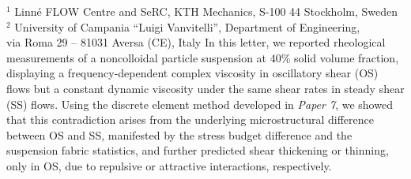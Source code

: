 %
%
%
%
%
%
%
\paperaffiliation
{%
  $^1$ Linn\'e FLOW Centre and SeRC, KTH Mechanics, S-100 44 Stockholm, Sweden\\%
  $^2$ University of Campania ``Luigi Vanvitelli'', Department of Engineering, \\via Roma 29 -- 81031 Aversa (CE), Italy%
}%
%
%
%
\papervolume{}%
%
\papernumber{}
%
\paperpages{}%
%
\paperyear{}%
%
\papersummary%
{%
   In this letter, we reported rheological measurements of a noncolloidal particle suspension at 40\% solid volume fraction, displaying a frequency-dependent complex viscosity in oscillatory shear (OS) flows but a constant dynamic viscosity under the same shear rates in steady shear (SS) flows. Using the discrete element method developed in \emph{Paper 7}, we showed that this contradiction arises from the underlying microstructural difference between OS and SS, manifested by the stress budget difference and the suspension fabric statistics, and further predicted shear thickening or thinning, only in OS, due to repulsive or attractive interactions, respectively.
}%
%
\graphicspath{{paper8/}}%
%
%
%

